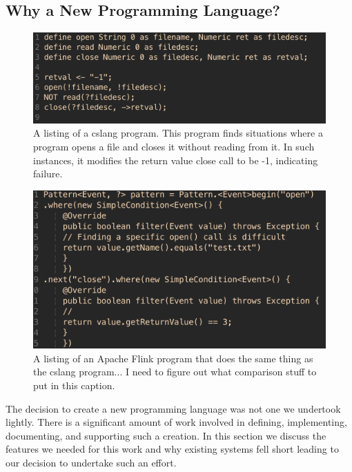 \subsection{Why a New Programming Language?}
\begin{figure}
  \includegraphics[scale=.50, frame]{images/cslanglisting}
  \caption{A listing of a cslang program.  This program finds situations
  where a program opens a file and closes it without reading from it.  In
  such instances, it modifies the return value close call to be -1,
  indicating failure.}
  \label{fig:cslanglisting}
\end{figure}

\begin{figure}
  \includegraphics[scale=.50, frame]{images/flinklisting}
  \caption{A listing of an Apache Flink program that does the same thing as the
  cslang program... I need to figure out what comparison stuff to put in
  this caption.}
  \label{fig:flinklisting}
\end{figure}


The decision to create a new programming language was not one we
undertook lightly.  There is a significant amount of work involved in defining,
implementing, documenting, and supporting such a creation.  In this section
we discuss the features we needed for this work and why existing systems fell short
leading to our decision to undertake such an effort.

